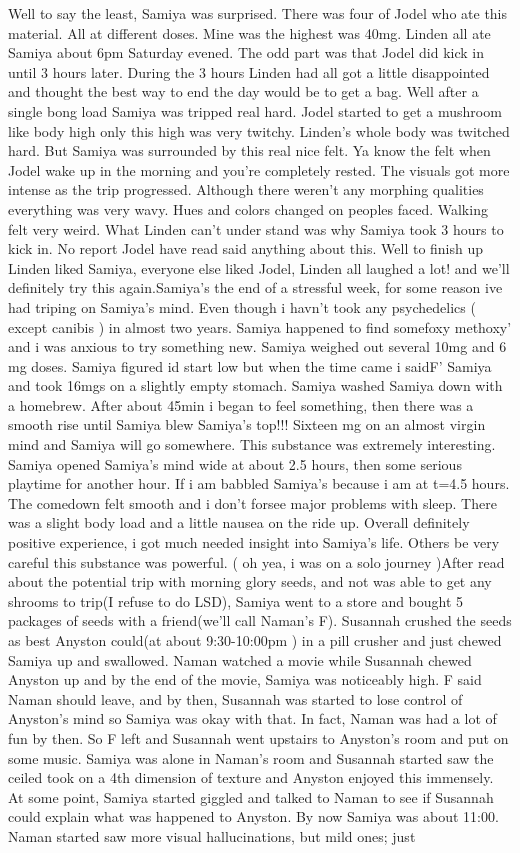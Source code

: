 \documentclass[12pt]{book}
\begin{document}
Well to say the least, Samiya was surprised. There was four of Jodel who ate this material. All at different doses. Mine was the highest was 40mg. Linden all ate Samiya about 6pm Saturday evened. The odd part was that Jodel did kick in until 3  hours later. During the 3 hours Linden had all got a little disappointed and thought the best way to end the day would be to get a bag. Well after a single bong load Samiya was tripped real hard. Jodel started to get a mushroom like body high only this high was very twitchy. Linden's whole body was twitched hard. But Samiya was surrounded by this real nice felt. Ya know the felt when Jodel wake up in the morning and you're completely rested. The visuals got more intense as the trip progressed. Although there weren't any morphing qualities everything was very wavy. Hues and colors changed on peoples faced. Walking felt very weird. What Linden can't under stand was why Samiya took 3  hours to kick in. No report Jodel have read said anything about this. Well to finish up Linden liked Samiya, everyone else liked Jodel, Linden all laughed a lot! and we'll definitely try this again.Samiya's the end of a stressful week, for some reason ive had triping on Samiya's mind. Even though i havn't took any psychedelics ( except canibis ) in almost two years. Samiya happened to find somefoxy methoxy' and i was anxious to try something new. Samiya weighed out several 10mg and 6 mg doses. Samiya figured id start low but when the time came i saidF' Samiya and took 16mgs on a slightly empty stomach. Samiya washed Samiya down with a homebrew. After about 45min i began to feel something, then there was a smooth rise until Samiya blew Samiya's top!!! Sixteen mg on an almost virgin mind and Samiya will go somewhere. This substance was extremely interesting. Samiya opened Samiya's mind wide at about 2.5 hours, then some serious playtime for another hour. If i am babbled Samiya's because i am at t=4.5 hours. The comedown felt smooth and i don't forsee major problems with sleep. There was a slight body load and a little nausea on the ride up. Overall definitely positive experience, i got much needed insight into Samiya's life. Others be very careful this substance was powerful. ( oh yea, i was on a solo journey )After read about the potential trip with morning glory seeds, and not was able to get any shrooms to trip(I refuse to do LSD), Samiya went to a store and bought 5 packages of seeds with a friend(we'll call Naman's F). Susannah crushed the seeds as best Anyston could(at about 9:30-10:00pm ) in a pill crusher and just chewed Samiya up and swallowed. Naman watched a movie while Susannah chewed Anyston up and by the end of the movie, Samiya was noticeably high. F said Naman should leave, and by then, Susannah was started to lose control of Anyston's mind so Samiya was okay with that. In fact, Naman was had a lot of fun by then. So F left and Susannah went upstairs to Anyston's room and put on some music. Samiya was alone in Naman's room and Susannah started saw the ceiled took on a 4th dimension of texture and Anyston enjoyed this immensely. At some point, Samiya started giggled and talked to Naman to see if Susannah could explain what was happened to Anyston. By now Samiya was about 11:00. Naman started saw more visual hallucinations, but mild ones; just 
\end{document}
